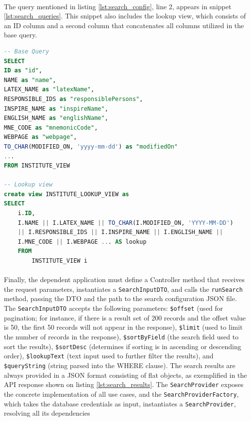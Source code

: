 \paragraph{} The query mentioned in listing \ref{lst:search_config}, line 2, appears in snippet \ref{lst:search_queries}. This snippet also includes the lookup view, which consists of an ID column and a second column that concatenates all columns utilized in the base query.

\begin{lstlisting}[language=SQL, caption={Base Query and Lookup View.}, basicstyle=\tiny, label=lst:search_queries]
-- Base Query
SELECT
ID as "id",
NAME as "name",
LATEX_NAME as "latexName",
RESPONSIBLE_IDS as "responsiblePersons",
INSPIRE_NAME as "inspireName",
ENGLISH_NAME as "englishName",
MNE_CODE as "mnemonicCode",
WEBPAGE as "webpage",
TO_CHAR(MODIFIED_ON, 'yyyy-mm-dd') as "modifiedOn"
...
FROM INSTITUTE_VIEW

-- Lookup view
create view INSTITUTE_LOOKUP_VIEW as
SELECT
    i.ID,
    I.NAME || I.LATEX_NAME || TO_CHAR(I.MODIFIED_ON, 'YYYY-MM-DD')
    || I.RESPONSIBLE_IDS || I.INSPIRE_NAME || I.ENGLISH_NAME || 
    I.MNE_CODE || I.WEBPAGE ... AS lookup
    FROM
        INSTITUTE_VIEW i
\end{lstlisting}

\paragraph{} Finally, the dependent application must define a Controller method that receives the request parameters, instantiates a \verb|SearchInputDTO|, and calls the \verb|runSearch| method, passing the DTO and the path to the search configuration JSON file. The \texttt{SearchInputDTO} accepts the following parameters: \verb|$offset| (used for pagination; for instance, if there is a result set of 200 records and the offset value is 50, the first 50 records will not appear in the response), \verb|$limit| (used to limit the number of records in the response), \verb|$sortByField| (the search field used to sort the results), \texttt{\$sortDesc} (determines if sorting is in ascending or descending order), \verb|$lookupText| (text input used to further filter the results), and \verb|$queryString| (string parsed into the WHERE clause). The search results are always provided in a JSON format consisting of flat objects, as exemplified in the API response shown on listing \ref{lst:search_results}. The \verb|SearchProvider| exposes the concrete implementation of all use cases, and the \verb|SearchProviderFactory|, which takes the database credentials as input, instantiates a \verb|SearchProvider|, resolving all its dependencies


